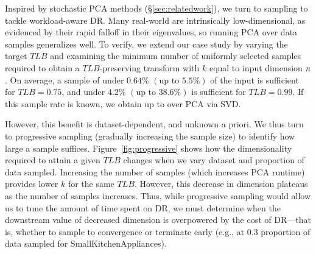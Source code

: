Inspired by stochastic PCA methods (\S\ref{sec:relatedwork}), we turn to sampling to tackle workload-aware DR. 
Many real-world  are intrinsically low-dimensional, as evidenced by their rapid falloff in their eigenvalues, so running PCA over data samples generalizes well. 
To verify, we extend our case study by varying the target $TLB$ and examining the minimum number of uniformly selected samples required to obtain a $TLB$-preserving transform with $k$ equal to input dimension ${\color{black}n}$.
On average, a sample of under $0.64\%$ $(\text{up to } 5.5\%)$ of the input is sufficient for $TLB = 0.75$, and under $4.2\%$ $(\text{up to } 38.6\%)$ is sufficient for $TLB=0.99$.  
If this sample rate is known, we obtain up to  over PCA via SVD.%

However, this benefit is dataset-dependent, and unknown a priori.
We thus turn to progressive sampling (gradually increasing the sample size) to identify how large a sample suffices.
Figure~\ref{fig:progressive} shows how the dimensionality required to attain a given $TLB$ changes when we vary dataset and proportion of data sampled.
Increasing the number of samples (which increases PCA runtime) provides lower $k$ for the same $TLB$.
However, this decrease in dimension plateaus as the number of samples increases.
Thus, while progressive sampling would allow us to tune the amount of time spent on DR, we must determine when the downstream value of decreased dimension is overpowered by the cost of DR---that is, whether to sample to convergence or terminate early (e.g., at $0.3$ proportion of data sampled for SmallKitchenAppliances). 






